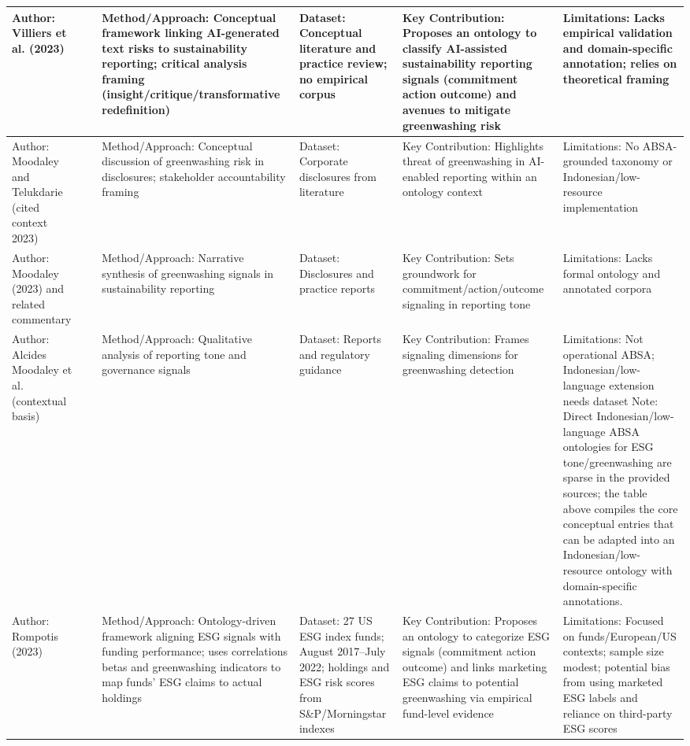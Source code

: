 \documentclass{article}
\begin{document}
\begin{landscape}
\begin{longtable}{p{1.8cm}
p{2.6cm}
p{3.4cm}
p{2.6cm}
p{3.5cm}
p{3.5cm}}
Author: Villiers et al. (2023) & ~ & Method/Approach: Conceptual framework linking AI-generated text risks to sustainability reporting; critical analysis framing (insight/critique/transformative redefinition) & Dataset: Conceptual literature and practice review; no empirical corpus & Key Contribution: Proposes an ontology to classify AI-assisted sustainability reporting signals (commitment action outcome) and avenues to mitigate greenwashing risk & Limitations: Lacks empirical validation and domain-specific annotation; relies on theoretical framing \\ \hline
Author: Moodaley and Telukdarie (cited context 2023) & ~ & Method/Approach: Conceptual discussion of greenwashing risk in disclosures; stakeholder accountability framing & Dataset: Corporate disclosures from literature & Key Contribution: Highlights threat of greenwashing in AI-enabled reporting within an ontology context & Limitations: No ABSA-grounded taxonomy or Indonesian/low-resource implementation \\ \hline
Author: Moodaley (2023) and related commentary & ~ & Method/Approach: Narrative synthesis of greenwashing signals in sustainability reporting & Dataset: Disclosures and practice reports & Key Contribution: Sets groundwork for commitment/action/outcome signaling in reporting tone & Limitations: Lacks formal ontology and annotated corpora \\ \hline
Author: Alcides Moodaley et al. (contextual basis) & ~ & Method/Approach: Qualitative analysis of reporting tone and governance signals & Dataset: Reports and regulatory guidance & Key Contribution: Frames signaling dimensions for greenwashing detection & Limitations: Not operational ABSA; Indonesian/low-language extension needs dataset Note: Direct Indonesian/low-language ABSA ontologies for ESG tone/greenwashing are sparse in the provided sources; the table above compiles the core conceptual entries that can be adapted into an Indonesian/low-resource ontology with domain-specific annotations. \\ \hline
Author: Rompotis (2023) & ~ & Method/Approach: Ontology-driven framework aligning ESG signals with funding performance; uses correlations betas and greenwashing indicators to map funds’ ESG claims to actual holdings & Dataset: 27 US ESG index funds; August 2017–July 2022; holdings and ESG risk scores from S\&P/Morningstar indexes & Key Contribution: Proposes an ontology to categorize ESG signals (commitment action outcome) and links marketing ESG claims to potential greenwashing via empirical fund-level evidence & Limitations: Focused on funds/European/US contexts; sample size modest; potential bias from using marketed ESG labels and reliance on third-party ESG scores \\ \hline

\end{longtable}
\end{landscape}
\end{document}
